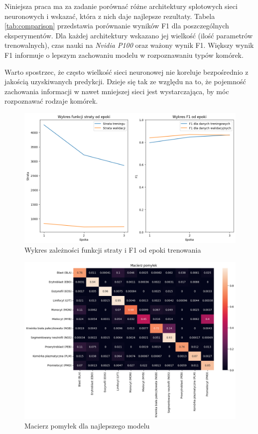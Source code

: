Niniejsza praca ma za zadanie porównać różne architektury splotowych sieci neuronowych i wskazać, która z nich daje najlepsze rezultaty.
Tabela \ref{tab:comparison} przedstawia porównanie wyników F1 dla poszczególnych eksperymentów.
Dla każdej architektury wskazano jej wielkość (ilość parametrów trenowalnych), czas nauki na \textit{Nvidia P100} oraz ważony wynik F1.
Większy wynik F1 informuje o lepszym zachowaniu modelu w rozpoznawaniu typów komórek.

Warto spostrzec, że często wielkość sieci neuronowej nie koreluje bezpośrednio z jakością uzyskiwanych predykcji.
Dzieje się tak ze względu na to, że pojemność zachowania informacji w nawet mniejszej sieci jest wystarczająca, by móc rozpoznawać rodzaje komórek.

\begin{figure}
    \centering
    \includegraphics[width=\textwidth]{experiments/efficientnet_b0/combined}
    \caption{Wykres zależności funkcji straty i F1 od epoki trenowania}
    \label{fig:plot}
\end{figure}

\begin{figure}
    \centering
    \includegraphics[width=\textwidth]{experiments/efficientnet_b0/confusion_matrix}
    \caption{Macierz pomyłek dla najlepszego modelu}
    \label{fig:confusion_matrix}
\end{figure}

